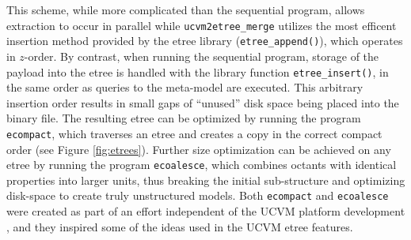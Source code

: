 This scheme, while more complicated than the sequential program, allows extraction to occur in parallel while \texttt{ucvm2etree\_merge} utilizes the most efficent insertion method provided by the etree library (\texttt{etree\_append()}), which operates in $z$-order. By contrast, when running the sequential program, storage of the payload into the etree is handled with the library function \texttt{etree\_insert()}, in the same order as queries to the meta-model are executed. This arbitrary insertion order results in small gaps of ``unused'' disk space being placed into the binary file. The resulting etree can be optimized by running the program \texttt{ecompact}, which traverses an etree and creates a copy in the correct compact order (see Figure \ref{fig:etrees}). Further size optimization can be achieved on any etree by running the program \texttt{ecoalesce}, which combines octants with identical properties into larger units, thus breaking the initial sub-structure and optimizing disk-space to create truly unstructured models. Both \texttt{ecompact} and \texttt{ecoalesce} were created as part of an effort independent of the UCVM platform development \citep{Schlosser_2008_Proc}, and they inspired some of the ideas used in the UCVM etree features.


